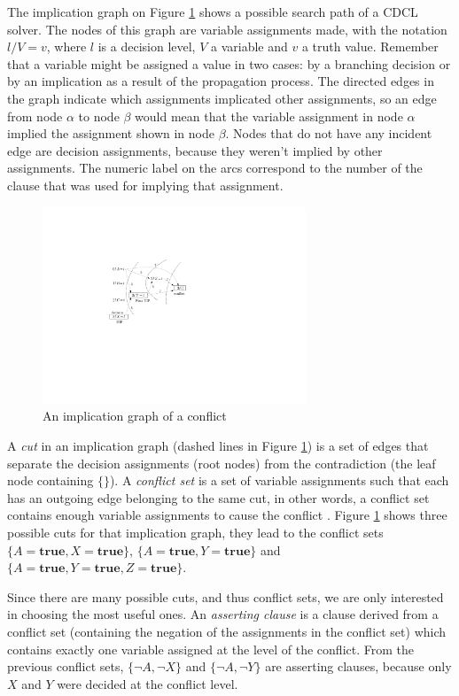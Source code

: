 \documentclass[12pt]{diicc}
\begin{document}
The implication graph on Figure \ref{fig:uip} shows a possible search path of a CDCL solver. The nodes of this graph are variable assignments made, with the notation $l/V=v$, where $l$ is a decision level, $V$ a variable and $v$ a truth value. Remember that a variable might be assigned a value in two cases: by a branching decision or by an implication as a result of the propagation process. The directed edges in the graph indicate which assignments implicated other assignments, so an edge from node $\alpha$ to node $\beta$ would mean that the variable assignment in node $\alpha$ implied the assignment shown in node $\beta$. Nodes that do not have any incident edge are decision assignments, because they weren't implied by other assignments. The numeric label on the arcs correspond to the number of the clause that was used for implying that assignment. 

\begin{figure}[h!]
	\centering
		\includegraphics[width=0.7\textwidth]{uip}
	\caption{An implication graph of a conflict}
	\label{fig:uip}
\end{figure}

A \textit{cut} in an implication graph (dashed lines in Figure \ref{fig:uip}) is a set of edges that separate the decision assignments (root nodes) from the contradiction (the leaf node containing $\{\}$). A \textit{conflict set} is a set of variable assignments such that each has an outgoing edge belonging to the same cut, in other words, a conflict set contains enough variable assignments to cause the conflict \cite{grasp,DBLP,ig}. Figure \ref{fig:uip} shows three possible cuts for that implication graph, they lead to the conflict sets $\{A=\textbf{true},X=\textbf{true}\}$, $\{A=\textbf{true},Y=\textbf{true}\}$ and $\{A=\textbf{true},Y=\textbf{true},Z=\textbf{true}\}$.

Since there are many possible cuts, and thus conflict sets, we are only interested in choosing the most useful ones. An \textit{asserting clause} \cite{cdcl1} is a clause derived from a conflict set (containing the negation of the assignments in the conflict set) which contains exactly one variable assigned at the level of the conflict. From the previous conflict sets, $\{\neg A,\neg X\}$ and $\{\neg A,\neg Y\}$ are asserting clauses, because only $X$ and $Y$ were decided at the conflict level. 
\end{document}
